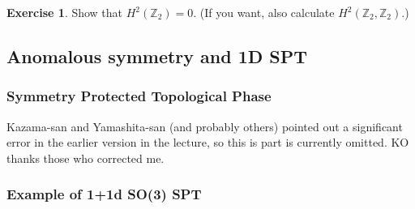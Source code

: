 \documentclass[
]{scrartcl}
\numberwithin{equation}{section}
\theoremstyle{definition}
\theoremstyle{definition}
\theoremstyle{definition}
\newtheorem{exercise}{Exercise}[section]
\theoremstyle{definition}
\theoremstyle{remark}
\begin{document}
\begin{exercise}
Show that \(H^2(\mathbb{Z}_2)=0\). (If you want, also calculate \(H^2(\mathbb{Z}_2,\mathbb{Z}_2)\).)
\end{exercise}

\hypertarget{anomalous-symmetry-and-1d-spt}{%
\subsection{Anomalous symmetry and 1D SPT}\label{anomalous-symmetry-and-1d-spt}}

\hypertarget{symmetry-protected-topological-phase}{%
\subsubsection{Symmetry Protected Topological Phase}\label{symmetry-protected-topological-phase}}

Kazama-san and Yamashita-san (and probably others) pointed out a significant error in the earlier version in the lecture, so this is part is currently omitted. KO thanks those who corrected me.

\hypertarget{example-of-11d-so3-spt}{%
\subsubsection{Example of 1+1d SO(3) SPT}\label{example-of-11d-so3-spt}}
\end{document}
